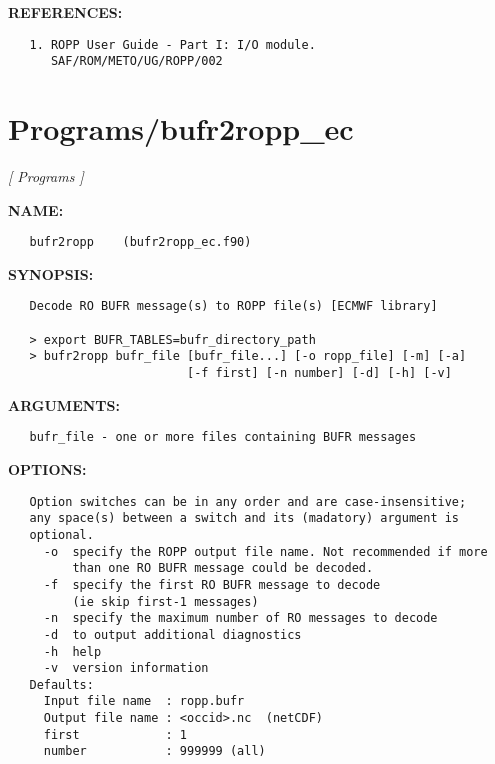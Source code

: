 \textbf{REFERENCES:}\hspace{0.08in}\begin{Verbatim}
   1. ROPP User Guide - Part I: I/O module.
      SAF/ROM/METO/UG/ROPP/002
\end{Verbatim}
\section{Programs/bufr2ropp\_ec}
\textsl{[ Programs ]}

\label{ch:robo80}
\label{ch:Programs_bufr2ropp_ec}
\textbf{NAME:}\hspace{0.08in}\begin{Verbatim}
   bufr2ropp    (bufr2ropp_ec.f90)
\end{Verbatim}
\textbf{SYNOPSIS:}\hspace{0.08in}\begin{Verbatim}
   Decode RO BUFR message(s) to ROPP file(s) [ECMWF library]

   > export BUFR_TABLES=bufr_directory_path
   > bufr2ropp bufr_file [bufr_file...] [-o ropp_file] [-m] [-a]
                         [-f first] [-n number] [-d] [-h] [-v]
\end{Verbatim}
\textbf{ARGUMENTS:}\hspace{0.08in}\begin{Verbatim}
   bufr_file - one or more files containing BUFR messages
\end{Verbatim}
\textbf{OPTIONS:}\hspace{0.08in}\begin{Verbatim}
   Option switches can be in any order and are case-insensitive;
   any space(s) between a switch and its (madatory) argument is
   optional.
     -o  specify the ROPP output file name. Not recommended if more
         than one RO BUFR message could be decoded.
     -f  specify the first RO BUFR message to decode
         (ie skip first-1 messages)
     -n  specify the maximum number of RO messages to decode
     -d  to output additional diagnostics
     -h  help
     -v  version information
   Defaults:
     Input file name  : ropp.bufr
     Output file name : <occid>.nc  (netCDF)
     first            : 1
     number           : 999999 (all)
\end{Verbatim}
